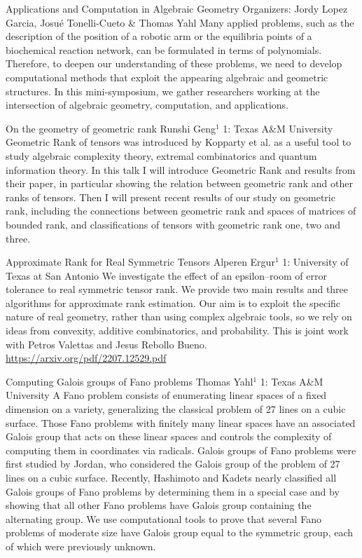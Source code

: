 \label{mini29}

\miniabs
{Applications and Computation in Algebraic Geometry}
{Organizers: Jordy Lopez Garcia, Josu\'e Tonelli-Cueto \& Thomas Yahl}
{Many applied problems, such as the description of the position of a robotic arm or the equilibria points of a biochemical reaction network, can be formulated in terms of polynomials. Therefore, to deepen our understanding of these problems, we need to develop computational methods that exploit the appearing algebraic and geometric structures. In this mini-symposium, we gather researchers working at the intersection of algebraic geometry, computation, and applications.}


\begin{addmargin}[2em]{0em}
\vspace{2ex}
\abs
{On the geometry of geometric rank}
{Runshi Geng$^{1}$}
{1: Texas A\&M University}
{Geometric Rank of tensors was introduced by Kopparty et al. as a useful tool to study algebraic complexity theory, extremal combinatorics and quantum information theory. In this talk I will introduce Geometric Rank and results from their paper, in particular showing the relation between geometric rank and other ranks of tensors. Then I will present recent results of our study on geometric rank, including the connections between geometric rank and spaces of matrices of bounded rank, and classifications of tensors with geometric rank one, two and three.}


\vspace{1.5ex}
\abs
{Approximate Rank for Real Symmetric Tensors}
{Alperen Ergur$^{1}$}
{1: University of Texas at San Antonio}
{We investigate the effect of an epsilon--room of error tolerance to real symmetric tensor rank. We provide two main results and three algorithms for approximate rank estimation. Our aim is to exploit the specific nature of real geometry, rather than using complex algebraic tools, so we rely on ideas from convexity, additive combinatorics, and probability. This is joint work with Petros Valettas and Jesus Rebollo Bueno. \href{https://arxiv.org/pdf/2207.12529.pdf}{https://arxiv.org/pdf/2207.12529.pdf}}


\vspace{1.5ex}
\abs
{Computing Galois groups of Fano problems}
{Thomas Yahl$^{1}$}
{1: Texas A\&M University}
{A Fano problem consists of enumerating linear spaces of a fixed dimension on a variety, generalizing the classical problem of 27 lines on a cubic surface. Those Fano problems with finitely many linear spaces have an associated Galois group that acts on these linear spaces and controls the complexity of computing them in coordinates via radicals. Galois groups of Fano problems were first studied by Jordan, who considered the Galois group of the problem of 27 lines on a cubic surface. Recently, Hashimoto and Kadets nearly classified all Galois groups of Fano problems by determining them in a special case and by showing that all other Fano problems have Galois group containing the alternating group. We use computational tools to prove that several Fano problems of moderate size have Galois group equal to the symmetric group, each of which were previously unknown. }



\end{addmargin}

